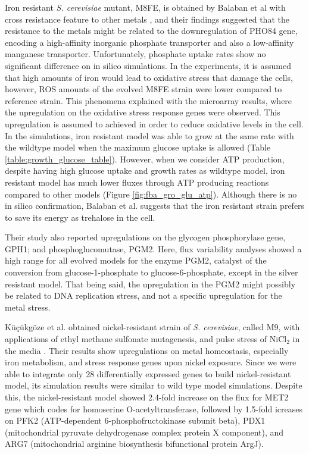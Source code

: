 Iron resistant \emph{S. cerevisiae} mutant, M8FE, is obtained by Balaban et al with cross resistance feature to other metals \cite{balaban2020evolutionary}, and their findings suggested that the resistance to the metals might be related to the downregulation of PHO84 gene, encoding a high-affinity inorganic phosphate transporter and also a low-affinity manganese transporter. Unfortunately, phosphate uptake rates show no significant difference on in silico simulations. In the experiments, it is assumed that high amounts of iron would lead to oxidative stress that damage the cells, however, ROS amounts of the evolved M8FE strain were lower compared to reference strain. This phenomena explained with the microarray results, where the upregulation on the oxidative stress response genes were observed. This upregulation is assumed to achieved in order to reduce oxidative levels in the cell. In the simulations, iron resistant model was able to grow at the same rate with the wildtype model when the maximum glucose uptake is allowed (Table \ref{table:growth_glucose_table}). However, when we consider ATP production, despite having high glucose uptake and growth rates as wildtype model, iron resistant model has much lower fluxes through ATP producing reactions compared to other models (Figure \ref{fig:fba_gro_glu_atp}). Although there is no in silico confirmation, Balaban et al. suggests that the iron resistant strain prefers to save its energy as trehalose in the cell.

Their study also reported upregulations on the glycogen phosphorylase gene, GPH1; and phosphoglucomutase, PGM2. Here, flux variability analyses showed a high range for all evolved models for the enzyme PGM2, catalyst of the conversion from glucose-1-phosphate to glucose-6-phosphate, except in the silver resistant model. That being said, the upregulation in the PGM2 might possibly be related to DNA replication stress, and not a specific upregulation for the metal stress.

Küçükgöze et al. obtained nickel-resistant strain of \emph{S. cerevisiae}, called M9, with applications of ethyl methane sulfonate mutagenesis, and pulse stress of NiCl$_2$ in the media \cite{kuccukgoze2013evolutionary}. Their results show upregulations on metal homeostasis, especially iron metabolism, and stress response genes upon nickel exposure. Since we were able to integrate only 28 differentially expressed genes to build nickel-resistant model, its simulation results were similar to wild type model simulations. Despite this, the nickel-resistant model showed 2.4-fold increase on the flux for MET2 gene which codes for homoserine O-acetyltransferase, followed by 1.5-fold icreases on PFK2 (ATP-dependent 6-phosphofructokinase subunit beta), PDX1 (mitochondrial pyruvate dehydrogenase complex protein X component), and ARG7 (mitochondrial arginine biosynthesis bifunctional protein ArgJ).

